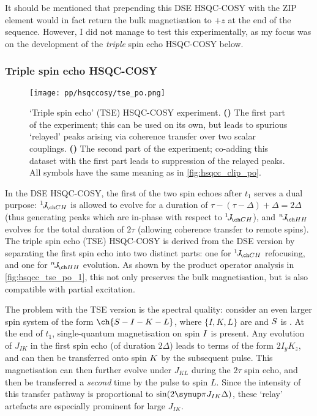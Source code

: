 It should be mentioned that prepending this DSE HSQC-COSY with the ZIP element would in fact return the bulk  magnetisation to $+z$ at the end of the sequence.
However, I did not manage to test this experimentally, as my focus was on the development of the \textit{triple} spin echo HSQC-COSY below.


\subsubsection{Triple spin echo HSQC-COSY}

\begin{figure}[!ht]
    \centering
    \texttt{[image: pp/hsqccosy/tse\_po.png]}%
    {\label{fig:hsqcc_tse_po_1}}%
    {\label{fig:hsqcc_tse_po_2}}%
    \caption[Triple spin echo HSQC-COSY experiment]{
        `Triple spin echo' (TSE) HSQC-COSY experiment.
        \textbf{()} The first part of the experiment; this can be used on its own, but leads to spurious `relayed' peaks arising via coherence transfer over two scalar couplings.
        \textbf{()} The second part of the experiment; co-adding this dataset with the first part leads to suppression of the relayed peaks.
        All symbols have the same meaning as in \cref{fig:hsqcc_clip_po}.
    }
    \label{fig:hsqcc_tse_po}
\end{figure}

In the DSE HSQC-COSY, the first of the two spin echoes after $t_1$ serves a dual purpose: $\oneJ{CH}$ is allowed to evolve for a duration of $\tau - (\tau - \Delta) + \Delta = 2\Delta$ (thus generating peaks which are in-phase with respect to $\oneJ{CH}$), and $\nJ{HH}$ evolves for the total duration of $2\tau$ (allowing coherence transfer to remote spins).
The triple spin echo (TSE) HSQC-COSY is derived from the DSE version by separating the first spin echo into two distinct parts: one for $\oneJ{CH}$ refocusing, and one for $\nJ{HH}$ evolution.
As shown by the product operator analysis in \cref{fig:hsqcc_tse_po_1}, this not only preserves the bulk  magnetisation, but is also compatible with partial  excitation.

The problem with the TSE version is the spectral quality: consider an even larger spin system of the form $\ch{S-I-K-L}$, where $\{I,K,L\}$ are \proton{} and $S\/$ is \carbon{}.
At the end of $t_1$, single-quantum magnetisation on spin $I\/$ is present.
Any evolution of $J_{IK}$ in the first spin echo (of duration $2\Delta$) leads to terms of the form $2I_yK_z$, and can then be transferred onto spin $K\/$ by the subsequent  pulse.
This magnetisation can then further evolve under $J_{KL}$ during the $2\tau$ spin echo, and then be transferred a \textit{second} time by the  pulse to spin $L$.
Since the intensity of this transfer pathway is proportional to $\sin(2\cpi J_{IK}\Delta)$, these `relay' artefacts are especially prominent for large $J_{IK}$.

